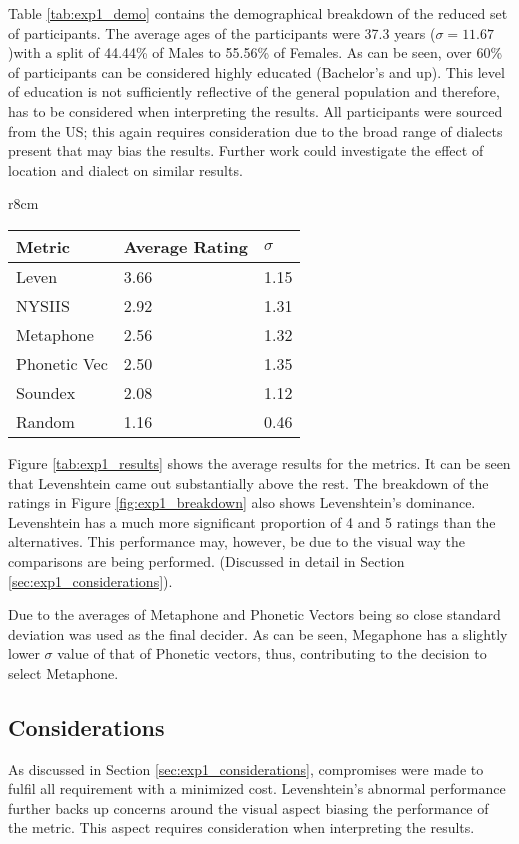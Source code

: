 Table \ref{tab:exp1_demo} contains the demographical breakdown of the reduced set of participants. The average ages of the participants were 37.3 years ($\sigma = 11.67$)with a split of 44.44\% of Males to 55.56\% of Females. As can be seen, over 60\% of participants can be considered highly educated (Bachelor’s and up). This level of education is not sufficiently reflective of the general population and therefore, has to be considered when interpreting the results. All participants were sourced from the US; this again requires consideration due to the broad range of dialects present that may bias the results. Further work could investigate the effect of location and dialect on similar results. 

\begin{wraptable}[11]{r}{8cm}
    \centering
    \begin{tabular}{|l|l|l|}
        \hline
        \textbf{Metric} & \textbf{Average Rating}  & \textbf{$\sigma$}\\
        \hline
        Leven     & 3.66  & 1.15\\
        NYSIIS    & 2.92 & 1.31\\
        Metaphone & 2.56 & 1.32\\
        Phonetic Vec & 2.50 & 1.35\\
        Soundex & 2.08 & 1.12 \\
        \hline
        Random  & 1.16 & 0.46\\
        \hline
    \end{tabular}
    \caption{Average metric performance}
    \label{tab:exp1_results}
\end{wraptable}


Figure \ref{tab:exp1_results} shows the average results for the metrics. It can be seen that Levenshtein came out substantially above the rest. The breakdown of the ratings in Figure \ref{fig:exp1_breakdown} also shows Levenshtein's dominance. Levenshtein has a much more significant proportion of 4 and 5 ratings than the alternatives. This performance may, however, be due to the visual way the comparisons are being performed. (Discussed in detail in Section \ref{sec:exp1_considerations}). 

Due to the averages of Metaphone and Phonetic Vectors being so close standard deviation was used as the final decider. As can be seen, Megaphone has a slightly lower $\sigma$ value of that of Phonetic vectors, thus, contributing to the decision to select Metaphone.

\subsection*{Considerations}
As discussed in Section \ref{sec:exp1_considerations}, compromises were made to fulfil all requirement with a minimized cost. Levenshtein's abnormal performance further backs up concerns around the visual aspect biasing the performance of the metric. This aspect requires consideration when interpreting the results. 

